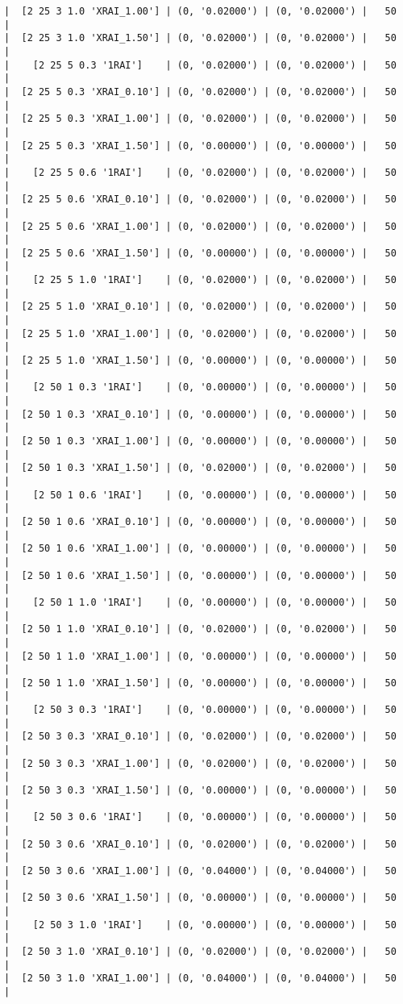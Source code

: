 \documentclass{article}
\begin{document}
\begin{verbatim}
|  [2 25 3 1.0 'XRAI_1.00'] | (0, '0.02000') | (0, '0.02000') |   50  |
|  [2 25 3 1.0 'XRAI_1.50'] | (0, '0.02000') | (0, '0.02000') |   50  |
|    [2 25 5 0.3 '1RAI']    | (0, '0.02000') | (0, '0.02000') |   50  |
|  [2 25 5 0.3 'XRAI_0.10'] | (0, '0.02000') | (0, '0.02000') |   50  |
|  [2 25 5 0.3 'XRAI_1.00'] | (0, '0.02000') | (0, '0.02000') |   50  |
|  [2 25 5 0.3 'XRAI_1.50'] | (0, '0.00000') | (0, '0.00000') |   50  |
|    [2 25 5 0.6 '1RAI']    | (0, '0.02000') | (0, '0.02000') |   50  |
|  [2 25 5 0.6 'XRAI_0.10'] | (0, '0.02000') | (0, '0.02000') |   50  |
|  [2 25 5 0.6 'XRAI_1.00'] | (0, '0.02000') | (0, '0.02000') |   50  |
|  [2 25 5 0.6 'XRAI_1.50'] | (0, '0.00000') | (0, '0.00000') |   50  |
|    [2 25 5 1.0 '1RAI']    | (0, '0.02000') | (0, '0.02000') |   50  |
|  [2 25 5 1.0 'XRAI_0.10'] | (0, '0.02000') | (0, '0.02000') |   50  |
|  [2 25 5 1.0 'XRAI_1.00'] | (0, '0.02000') | (0, '0.02000') |   50  |
|  [2 25 5 1.0 'XRAI_1.50'] | (0, '0.00000') | (0, '0.00000') |   50  |
|    [2 50 1 0.3 '1RAI']    | (0, '0.00000') | (0, '0.00000') |   50  |
|  [2 50 1 0.3 'XRAI_0.10'] | (0, '0.00000') | (0, '0.00000') |   50  |
|  [2 50 1 0.3 'XRAI_1.00'] | (0, '0.00000') | (0, '0.00000') |   50  |
|  [2 50 1 0.3 'XRAI_1.50'] | (0, '0.02000') | (0, '0.02000') |   50  |
|    [2 50 1 0.6 '1RAI']    | (0, '0.00000') | (0, '0.00000') |   50  |
|  [2 50 1 0.6 'XRAI_0.10'] | (0, '0.00000') | (0, '0.00000') |   50  |
|  [2 50 1 0.6 'XRAI_1.00'] | (0, '0.00000') | (0, '0.00000') |   50  |
|  [2 50 1 0.6 'XRAI_1.50'] | (0, '0.00000') | (0, '0.00000') |   50  |
|    [2 50 1 1.0 '1RAI']    | (0, '0.00000') | (0, '0.00000') |   50  |
|  [2 50 1 1.0 'XRAI_0.10'] | (0, '0.02000') | (0, '0.02000') |   50  |
|  [2 50 1 1.0 'XRAI_1.00'] | (0, '0.00000') | (0, '0.00000') |   50  |
|  [2 50 1 1.0 'XRAI_1.50'] | (0, '0.00000') | (0, '0.00000') |   50  |
|    [2 50 3 0.3 '1RAI']    | (0, '0.00000') | (0, '0.00000') |   50  |
|  [2 50 3 0.3 'XRAI_0.10'] | (0, '0.02000') | (0, '0.02000') |   50  |
|  [2 50 3 0.3 'XRAI_1.00'] | (0, '0.02000') | (0, '0.02000') |   50  |
|  [2 50 3 0.3 'XRAI_1.50'] | (0, '0.00000') | (0, '0.00000') |   50  |
|    [2 50 3 0.6 '1RAI']    | (0, '0.00000') | (0, '0.00000') |   50  |
|  [2 50 3 0.6 'XRAI_0.10'] | (0, '0.02000') | (0, '0.02000') |   50  |
|  [2 50 3 0.6 'XRAI_1.00'] | (0, '0.04000') | (0, '0.04000') |   50  |
|  [2 50 3 0.6 'XRAI_1.50'] | (0, '0.00000') | (0, '0.00000') |   50  |
|    [2 50 3 1.0 '1RAI']    | (0, '0.00000') | (0, '0.00000') |   50  |
|  [2 50 3 1.0 'XRAI_0.10'] | (0, '0.02000') | (0, '0.02000') |   50  |
|  [2 50 3 1.0 'XRAI_1.00'] | (0, '0.04000') | (0, '0.04000') |   50  |

\end{verbatim}
\end{document}
